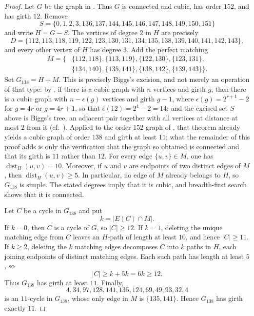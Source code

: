 \documentclass[11pt]{amsart}
\newcommand{\dist}{\operatorname{dist}}
\begin{document}
\begin{proof}
Let $G$ be the graph in . Thus $G$ is
connected and cubic, has order $152$, and has girth $12$. Remove
\[
S=\{0,1,2,3,136,137,144,145,146,147,148,149,150,151\}
\]
and write $H=G-S$. The vertices of degree $2$ in $H$ are precisely
\[
D=\{112,113,118,119,122,123,130,131,
     134,135,138,139,140,141,142,143\},
\]
and every other vertex of $H$ has degree $3$. Add the perfect matching
\begin{align*}
M=\{&
\{112,118\},\{113,119\},\{122,130\},\{123,131\},\\
&
\{134,140\},\{135,141\},\{138,142\},\{139,143\}
\}.
\end{align*}
Set $G_{138}=H+M$. This is precisely Biggs's excision, and not merely an
operation of that type: by \cite[Theorem~4.2]{Biggs}, if there is a
cubic graph with $n$ vertices and girth $g$, then there is a cubic graph
with $n-\epsilon(g)$ vertices and girth $g-1$, where
$\epsilon(g)=2^{r+1}-2$ for $g=4r$ or $g=4r+1$, so that
$\epsilon(12)=2^{4}-2=14$; and the excised set $S$ above is Biggs's
tree, an adjacent pair together with all vertices at distance at most
$2$ from it (cf.\ \cite[Example~4.5]{Biggs}). Applied to the order-$152$
graph of \cite{ExooEtAl}, that theorem already yields a cubic graph of
order $138$ and girth at least $11$; what the remainder of this proof
adds is only the verification that the graph so obtained is connected
and that its girth is $11$ rather than $12$. For every edge
$\{u,v\}\in M$, one has
$\dist_H(u,v)=10$. Moreover, if $u$ and $v$ are endpoints of two
distinct edges of $M$, then $\dist_H(u,v)\geq 5$. In particular, no
edge of $M$ already belongs to $H$, so $G_{138}$ is simple. The stated
degrees imply that it is cubic, and breadth-first search shows that it
is connected.

Let $C$ be a cycle in $G_{138}$ and put
\[
k=|E(C)\cap M|.
\]
If $k=0$, then $C$ is a cycle of $G$, so $|C|\geq 12$. If $k=1$,
deleting the unique matching edge from $C$ leaves an $H$-path of length
at least $10$, and hence $|C|\geq 11$. If $k\geq 2$, deleting the $k$
matching edges decomposes $C$ into $k$ paths in $H$, each joining
endpoints of distinct matching edges. Each such path has length at
least $5$, so
\[
|C|\geq k+5k=6k\geq 12.
\]
Thus $G_{138}$ has girth at least $11$. Finally,
\[
4,34,97,128,141,135,124,69,49,93,32,4
\]
is an $11$-cycle in $G_{138}$, whose only edge in $M$ is
$\{135,141\}$. Hence $G_{138}$ has girth exactly $11$.
\end{proof}
\end{document}
